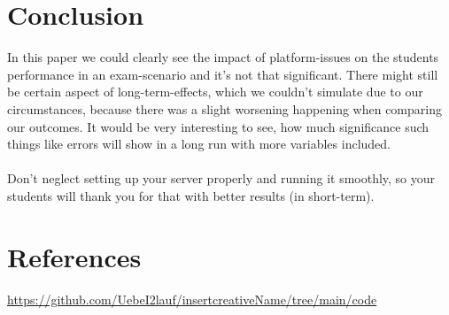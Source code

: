\documentclass[12pt, a4paper]{article}
\begin{document}
\section{Conclusion}
In this paper we could clearly see the impact of platform-issues on the students performance in an exam-scenario and it's not that significant. There might still be certain aspect of long-term-effects,
which we couldn't simulate due to our circumstances, because there was a slight worsening happening when comparing our outcomes. It would be very interesting to see, how much significance such things like errors will show  in a long run with more variables included. \\\\
Don't neglect setting up your server properly and running it smoothly, so your students will thank you for that with better results (in short-term). 

\section{References}
\url{https://github.com/UebeI2lauf/insertcreativeName/tree/main/code}
\end{document}
